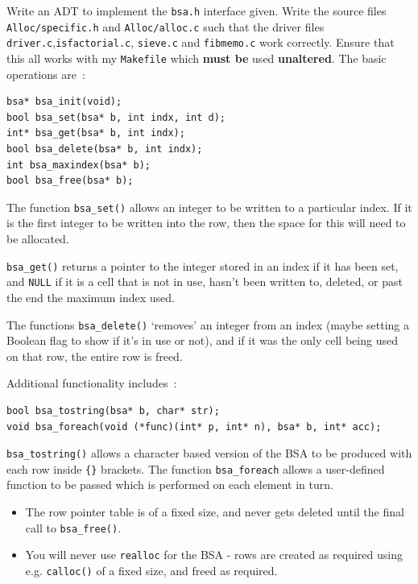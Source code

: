\begin{exercise}
Write an ADT to implement the \verb^bsa.h^ interface given.  Write the
source files \verb^Alloc/specific.h^ and \verb^Alloc/alloc.c^ such that
the driver files \verb^driver.c^,\verb^isfactorial.c^, \verb^sieve.c^ and \verb^fibmemo.c^
work correctly.  Ensure that this all works with my \verb^Makefile^
which {\bf must be} used {\bf unaltered}.  The basic operations are~:
\begin{verbatim}
bsa* bsa_init(void);
bool bsa_set(bsa* b, int indx, int d);
int* bsa_get(bsa* b, int indx);
bool bsa_delete(bsa* b, int indx);
int bsa_maxindex(bsa* b);
bool bsa_free(bsa* b);
\end{verbatim}

\noindent The function \verb^bsa_set()^ allows an integer to be written to a
particular index. If it is the first integer to be written into the row, then
the space for this will need to be allocated.

\noindent \verb^bsa_get()^ returns a pointer to the integer
stored in an index if it has been set, and \verb^NULL^ if it is a cell
that is not in use, hasn't been written to, deleted,  or past the end
the maximum index used.

\noindent The functions \verb^bsa_delete()^ `removes' an integer from an index
(maybe setting a Boolean flag to show if it's in use or not), and
if it was the only cell being used on that row, the entire row is freed.

\noindent Additional functionality includes~:
\begin{verbatim}
bool bsa_tostring(bsa* b, char* str);
void bsa_foreach(void (*func)(int* p, int* n), bsa* b, int* acc);
\end{verbatim}

\noindent \verb^bsa_tostring()^ allows a character based version of the BSA to be produced
with each row inside \verb^{}^ brackets. The function \verb^bsa_foreach^
allows a user-defined function to be passed which is performed on each
element in turn.

\begin{itemize}

\item The row pointer table is of a fixed size, and never gets deleted
until the final call to \verb^bsa_free()^.

\item You will never use \verb^realloc^ for the BSA - rows are created
as required using e.g. \verb^calloc()^ of a fixed size, and freed as
required.


\end{itemize}
\end{exercise}
